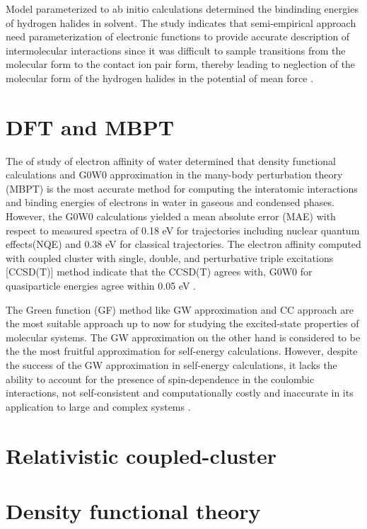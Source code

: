 \documentclass[a4paper,11pt]{report}
\begin{document}
Model parameterized to ab initio calculations determined the bindinding energies of hydrogen halides in solvent. The study indicates that 
semi-empirical approach need parameterization of electronic functions to provide accurate description of intermolecular interactions since
it was difficult to sample transitions from the molecular form to the contact ion pair form, thereby leading to neglection of the molecular form of the hydrogen 
halides in the potential of mean force \citep{wick2017comparison}.



\chapter{DFT and MBPT}
The of study of electron affinity of water determined that density functional calculations and G0W0 approximation in the many-body 
perturbation theory (MBPT) is the most accurate method for computing the interatomic interactions  and binding energies of electrons
in water in gaseous and condensed phases. However, the G0W0 calculations yielded a mean absolute error (MAE) with respect to measured
spectra of 0.18 eV for trajectories including nuclear quantum effects(NQE) and 0.38 eV for classical trajectories. The electron affinity
computed with coupled cluster with single, double, and perturbative triple excitations [CCSD(T)] method indicate that the CCSD(T) agrees
with, G0W0 for quasiparticle energies agree within 0.05 eV \citep{gaiduk2018electron}.

The Green function (GF) method like GW approximation and CC approach are the most suitable approach up to now for studying the excited-state
properties of molecular systems. The GW approximation on the other hand is considered to be the the most fruitful approximation for self-energy
calculations. However, despite the success of the GW approximation in self-energy calculations, it lacks the ability to account for the
presence of spin-dependence in the coulombic interactions, not self-consistent and computationally costly and inaccurate in its application
to large and complex systems \citep{aryasetiawan1998gw}.




\chapter{Relativistic coupled-cluster}

\chapter{Density functional theory}
\end{document}
